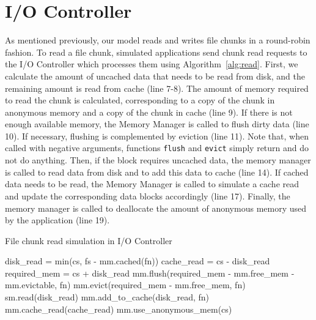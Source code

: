 \section{I/O Controller}

As mentioned previously, our model reads and writes file chunks in a
round-robin fashion. To read a file chunk, simulated applications send
chunk read requests to the I/O Controller which processes them using
Algorithm~\ref{alg:read}. First, we calculate the amount of uncached
data that needs to be read from disk, and the remaining amount is read
from cache (line 7-8). The amount of memory required to read the chunk
is calculated, corresponding to a copy of the chunk in anonymous memory
and a copy of the chunk in cache (line 9).
If there is not enough available memory, the Memory Manager is called
to flush dirty data (line 10). If necessary, flushing is complemented by
eviction (line 11). Note that, when called with negative arguments, functions
\texttt{flush} and \texttt{evict} simply return and do not do anything. Then,
if the block requires
uncached data, the memory manager is called to read data from disk and to add this
data to cache (line 14).
If cached data needs to be read, the Memory Manager is called to simulate
a cache read  and update the corresponding data blocks accordingly (line 17).
Finally, the memory manager is called to deallocate the amount of anonymous memory used by the application (line 19).

\begin{algorithm}[H]
\caption{File chunk read simulation in I/O Controller}
\label{alg:read}
    \small
    \begin{algorithmic}[1]
        \Input
           \EndInput
           \State disk\_read = min(cs, fs - mm.cached(fn)) 
           \State cache\_read = cs - disk\_read 
           \State required\_mem = cs + disk\_read
           \State mm.flush(required\_mem - mm.free\_mem - mm.evictable, fn)
           \State mm.evict(required\_mem - mm.free\_mem, fn)
             
           \State sm.read(disk\_read)
           \State mm.add\_to\_cache(disk\_read, fn)
           \EndIf
            
           \State mm.cache\_read(cache\_read)
        \EndIf
        \State mm.use\_anonymous\_mem(cs)
    \end{algorithmic}
\end{algorithm}

